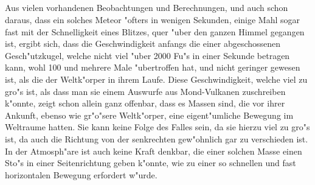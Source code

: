 \documentclass[a4paper, 11pt, oneside, polutonikogreek, german]{article}
\begin{document}
\subsection{}
\paragraph{}
Aus vielen vorhandenen Beobachtungen und Berechnungen, und auch schon daraus, dass ein solches Meteor "ofters in wenigen Sekunden, einige Mahl sogar fast mit der Schnelligkeit eines Blitzes, quer "uber den ganzen Himmel gegangen ist, ergibt sich, dass die Geschwindigkeit anfangs die einer abgeschossenen Gesch"utzkugel, welche nicht viel "uber 2000 Fu"s in einer Sekunde betragen kann, wohl 100 und mehrere Male "ubertroffen hat, und nicht geringer gewesen ist, als die der Weltk"orper in ihrem Laufe. Diese Geschwindigkeit, welche viel zu gro"s ist, als dass man sie einem Auswurfe aus Mond-Vulkanen zuschreiben k"onnte, zeigt schon allein ganz offenbar, dass es Massen sind, die vor ihrer Ankunft, ebenso wie gr"o"sere Weltk"orper, eine eigent"umliche Bewegung im Weltraume hatten. Sie kann keine Folge des Falles sein, da sie hierzu viel zu gro"s ist, da auch die Richtung von der senkrechten gew"ohnlich gar zu verschieden ist. In der Atmosph"are ist auch keine Kraft denkbar, die einer solchen Masse einen Sto"s in einer Seitenrichtung geben k"onnte, wie zu einer so schnellen und fast horizontalen Bewegung erfordert w"urde.
\end{document}
